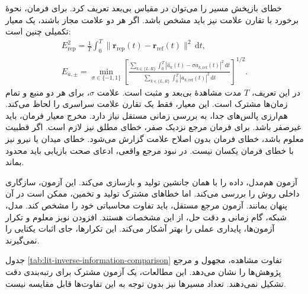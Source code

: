 خطای بازپخش مسیر را می‌توان در مقیاس بی‌بعد تعریف کرد.
برای فرمان، نحوهٔ برخورد با تقارن علامت نیز باید مشخص باشد.
اگر هر دو علامت مجاز باشند، یک معیار تکمیلی چنین است:
\begin{equation}
\begin{gathered}
E_{\mathrm{rep}}^2
=\frac{1}{T}\int_0^T
\|\mathbf r_{\mathrm{rep}}(t)-\mathbf r_{\mathrm{ref}}(t)\|^2\,\mathrm dt,\\
E_{a,\pm}
=\min_{\sigma\in\{-1,1\}}
\left[
\frac{\displaystyle\sum_{k\in\{L,R\}}\int_0^T
|\widehat a_k(t)-\sigma a_{k,\mathrm{ref}}(t)|^2\,\mathrm dt}
{\displaystyle\sum_{k\in\{L,R\}}\int_0^T
|a_{k,\mathrm{ref}}(t)|^2\,\mathrm dt}
\right]^{1/2}.
\end{gathered}
\label{eq:lit-magnetic-validation-errors}
\end{equation}
در این تعریف، $T$ مدت مشاهدهٔ بی‌بعد و مثبت است.
علامت $\sigma$، برای هر دو منبع و تمام زمان‌ها مشترک است.
این معیار، فقط یک تقارن علامت سراسری را لحاظ می‌کند.
هم‌ارزی پالس‌های جدا، به بررسی زمانی مستقل نیاز دارد.
مخرج معیار فرمان، باید غیرصفر باشد.
برای فرمان مرجع نزدیک صفر، خطای مطلق نیز لازم است.
اگر قطبیت معلوم باشد، خطای فرمان بدون اصلاح علامت گزارش می‌شود.
خطای میدان یا نیرو نیز با خطای فرمان یکسان نیست.
در نبود مرجع واقعی، ادعای صحت بازیابی باید محدود بماند.

آزمون هم‌مدل، داده را با همان جانشین تولید و بازسازی می‌کند.
این آزمون، سازگاری داخلی روش را بررسی می‌کند.
اما خطاهای مشترک تولید و تخمین، ممکن است در آن پنهان بمانند.
آزمون مرجع مستقل، باید تفاوت محاسباتی خود را مشخص کند.
مدل، شبکه، گام زمانی و دقت حل، از این مشخصات هستند.
افزودن نویز معلوم و تکرار آزمون‌ها، پایداری عملی را بهتر آشکار می‌کند.
این تکرارها، جای اثبات یکتایی را نمی‌گیرند.

جدول \ref{tab:lit-inverse-information-comparison} تفاوت مشاهده، مجهول و مرجع پژوهش‌ها را نشان می‌دهد.
این مطالعات، یک آزمون مشترک برای رتبه‌بندی دقت تشکیل نمی‌دهند.
تعداد مسیرها نیز بدون توجه به این تفاوت‌ها قابل مقایسه نیست.

